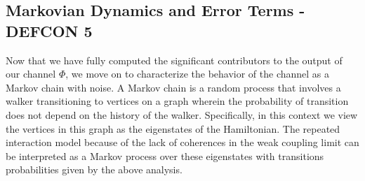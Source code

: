 \documentclass{article}
\newtheorem{definition}{Definition}
\newcommand{\matt}[1]{\todo[color=red!50, prepend, caption={Matt}, tickmarkheight=0.25cm]{#1}}
\newcommand{\on}{\rm on}
\newcommand{\off}{\rm off}
\newcommand{\ket}[1]{|#1\rangle}
\newcommand{\bra}[1]{\langle #1|}
\newcommand{\ketbra}[2]{| #1\rangle\! \langle #2|}
\newcommand{\TT}{\mathcal{T}}
\DeclareMathOperator{\sinc}{sinc}
\begin{document}

\subsection{Markovian Dynamics and Error Terms - DEFCON 5}

Now that we have fully computed the significant contributors to the output of our channel $\Phi$, we move on to characterize the behavior of the channel as a Markov chain with noise. 
A Markov chain is a random process that involves a walker transitioning to vertices on a graph wherein the probability of transition does not depend on the history of the walker.  Specifically, in this context we view the vertices in this graph as the eigenstates of the Hamiltonian.  The repeated interaction model because of the lack of coherences in the weak coupling limit can be interpreted as a Markov process over these eigenstates with transitions probabilities given by the above analysis. 
\end{document}
